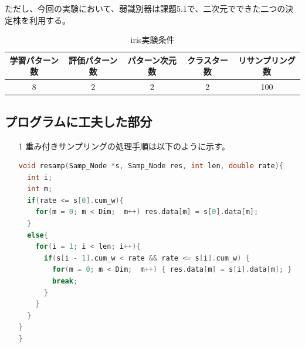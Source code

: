 \documentclass[ %
  uplatex,%
  papersize%
]{jsarticle}
\begin{document}
ただし、今回の実験において、弱識別器は課題5.1で、二次元でできた二つの決定株を利用する。
\begin{table}[h]\footnotesize
\caption{iris実験条件}
\label{}
\centering
\begin{tabular}{|c|c|c|c|c|}
\hline
学習パターン数&評価パターン数&パターン次元数&クラスター数&リサンプリング数\\
\hline
8&2&2&2&100\\
\hline
\end{tabular} 
\end{table}

\subsection{プログラムに工夫した部分}
\begin{itemize}
\item[1] 重み付きサンプリングの処理手順は以下のように示す。
\newpage

\begin{lstlisting}[language=c,caption=Gini impurity]
void resamp(Samp_Node *s, Samp_Node res, int len, double rate){
  int i;
  int m;
  if(rate <= s[0].cum_w){
    for(m = 0; m < Dim;  m++) res.data[m] = s[0].data[m];
  }
  else{
    for(i = 1; i < len; i++){
      if(s[i - 1].cum_w < rate && rate <= s[i].cum_w) {
        for(m = 0; m < Dim;  m++) { res.data[m] = s[i].data[m]; }
        break;
      }
    }
  }
}
}\end{lstlisting}


\end{itemize}
\end{document}
